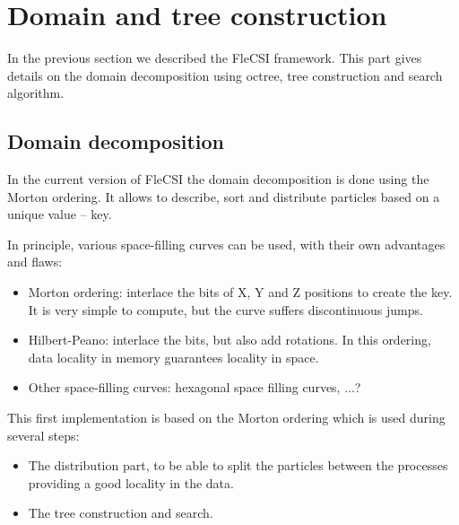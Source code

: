 \documentclass[notes.tex]{subfiles}
\begin{document}
\section{Domain and tree construction}
In the previous section we described the FleCSI framework.
This part gives details on the domain decomposition using octree, tree 
construction and search algorithm.

\subsection{Domain decomposition}
In the current version of FleCSI the domain decomposition is done using the
Morton ordering.
It allows to describe, sort and distribute particles based on a unique value
-- key.

In principle, various space-filling curves can be used, with their own
advantages and flaws:
\begin{itemize}
\item Morton ordering: interlace the bits of X, Y and Z positions to create
the key. It is very simple to compute, but the curve suffers discontinuous
jumps.
\item Hilbert-Peano: interlace the bits, but also add rotations. In this
ordering, data locality in memory guarantees locality in space.
\item Other space-filling curves: hexagonal space filling curves, ...?
\end{itemize}

This first implementation is based on the Morton ordering which is used during
several steps:
\begin{itemize}
\item The distribution part, to be able to split the particles between the
processes providing a good locality in the data.
\item The tree construction and search. 
\end{itemize}
\end{document}
